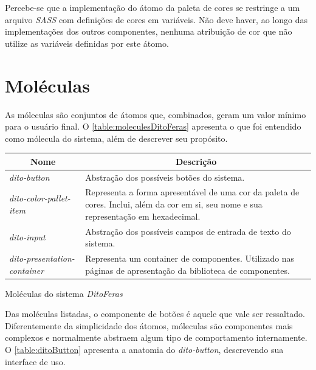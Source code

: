 Percebe-se que a implementação do átomo da paleta de cores se restringe a um arquivo \textit{SASS} com definições de cores em variáveis. Não deve haver, ao longo das implementações dos outros componentes, nenhuma atribuição de cor que não utilize as variáveis definidas por este átomo.

\section{Moléculas}

As móleculas são conjuntos de átomos que, combinados, geram um valor mínimo para o usuário final. O \autoref{table:moleculesDitoFeras} apresenta o que foi entendido como mólecula do sistema, além de descrever seu propósito.

\begin{quadro}
\centering
\begin{tabular}{|m{4cm}|m{10cm}|} \hline
	
	\multicolumn{1}{|c|}{\bfseries Nome} & \multicolumn{1}{c|}{\bfseries Descrição} \\\hline
	
	 \textit{dito-button} & Abstração dos possíveis botões do sistema. \\\hline
	 
	 \textit{dito-color-pallet-item} & Representa a forma apresentável de uma cor da paleta de cores. Inclui, além da cor em si, seu nome e sua representação em hexadecimal. \\\hline
	 
	 \textit{dito-input} & Abstração dos possíveis campos de entrada de texto do sistema. \\\hline
	 
	 \textit{dito-presentation-container} & Representa um container de componentes. Utilizado nas páginas de apresentação da biblioteca de componentes. \\\hline
    
\end{tabular}
\caption{Moléculas do sistema \textit{DitoFeras}}
\label{table:moleculesDitoFeras}
\end{quadro}

Das moléculas listadas, o componente de botões é aquele que vale ser ressaltado. Diferentemente da simplicidade dos átomos, móleculas são componentes mais complexos e normalmente abstraem algum tipo de comportamento internamente. O \autoref{table:ditoButton} apresenta a anatomia do \textit{dito-button}, descrevendo sua interface de uso.


